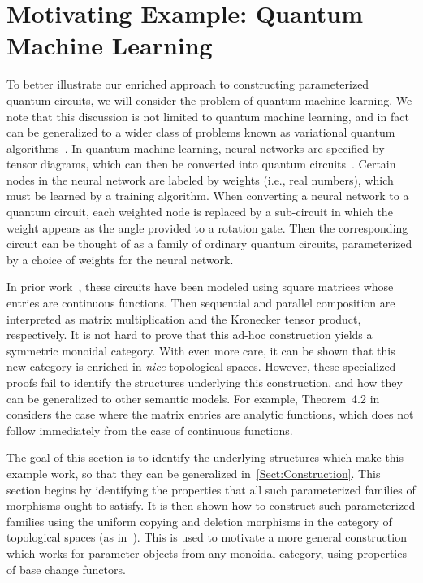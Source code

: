 \section{Motivating Example: Quantum Machine Learning}
%
\label{Sect:Motivation}

To better illustrate our enriched approach to constructing parameterized quantum circuits, we will consider the problem of quantum machine learning.
We note that this discussion is not limited to quantum machine learning, and in fact can be generalized to a wider class of problems known as variational quantum algorithms~\cite{CerezoArrasmith2021}.
In quantum machine learning, neural networks are specified by tensor diagrams, which can then be converted into quantum circuits~\cite{HugginsPatil2019}.
Certain nodes in the neural network are labeled by weights (i.e., real numbers), which must be learned by a training algorithm.
When converting a neural network to a quantum circuit, each weighted node is replaced by a sub-circuit in which the weight appears as the angle provided to a rotation gate.
Then the corresponding circuit can be thought of as a family of ordinary quantum circuits, parameterized by a choice of weights for the neural network.

In prior work~\cite{JeandelPerdrix2018,XuLi2022,PehamBurgholzer2023,HongHuang2024}, these circuits have been modeled using square matrices whose entries are continuous functions.
Then sequential and parallel composition are interpreted as matrix multiplication and the Kronecker tensor product, respectively.
It is not hard to prove that this ad-hoc construction yields a symmetric monoidal category.
With even more care, it can be shown that this new category is enriched in \emph{nice} topological spaces.
However, these specialized proofs fail to identify the structures underlying this construction, and how they can be generalized to other semantic models.
For example, Theorem~4.2 in~\cite{PehamBurgholzer2023} considers the case where the matrix entries are analytic functions, which does not follow immediately from the case of continuous functions.

The goal of this section is to identify the underlying structures which make this example work, so that they can be generalized in~\cref{Sect:Construction}.
This section begins by identifying the properties that all such parameterized families of morphisms ought to satisfy.
It is then shown how to construct such parameterized families using the uniform copying and deletion morphisms in the category of topological spaces (as in~\cite{Wesley2025}).
This is used to motivate a more general construction which works for parameter objects from any monoidal category, using properties of base change functors.

